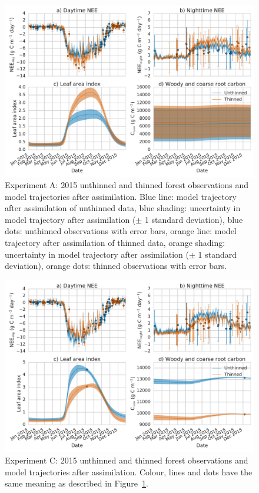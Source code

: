 \documentclass[draft,linenumbers]{agujournal}
\begin{document}
\begin{figure}[ht]
    \centering
        \includegraphics[width=\textwidth]{obs_compa.pdf}
\caption{Experiment A: 2015 unthinned and thinned forest observations and model trajectories after assimilation. Blue line: model trajectory after assimilation of unthinned data, blue shading: uncertainty in model trajectory after assimilation (\(\pm\) 1 standard deviation), blue dots: unthinned observations with error bars, orange line: model trajectory after assimilation of thinned data, orange shading: uncertainty in model trajectory after assimilation (\(\pm\) 1 standard deviation), orange dots: thinned observations with error bars.}
 \label{fig:obscompa}
 \end{figure}
 
 \begin{figure}[ht]
    \centering
        \includegraphics[width=\textwidth]{obs_compc.pdf}
\caption{Experiment C: 2015 unthinned and thinned forest observations and model trajectories after assimilation. Colour, lines and dots have the same meaning as described in Figure~\ref{fig:obscompa}.}
 \label{fig:obscompc}
 \end{figure}
\end{document}
